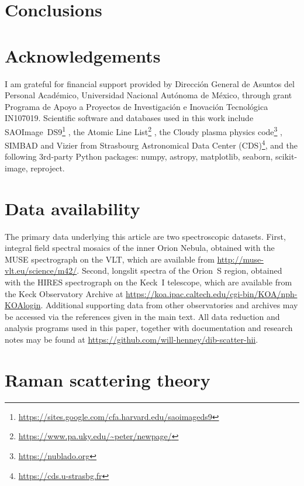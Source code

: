 \documentclass[useAMS, usenatbib, a4paper]{mnras}
\begin{document}
\section{Conclusions}
\label{sec:conclusions}




\section*{Acknowledgements}
I am grateful for financial support provided by
\foreignlanguage{spanish}{
  Dirección General de Asuntos del Personal Académico,
  Universidad Nacional Autónoma de México},
through grant
\foreignlanguage{spanish}{
  Programa de Apoyo a Proyectos de Investigación
  e Inovación Tecnológica}
IN107019.
Scientific software and databases used in this work include
SAOImage~DS9\footnote{\url{https://sites.google.com/cfa.harvard.edu/saoimageds9}} \citep{Joye:2003a},
the Atomic Line List\footnote{\url{https://www.pa.uky.edu/~peter/newpage/}} \citep{Van-Hoof:2018a},
the Cloudy plasma physics code\footnote{\url{https://nublado.org}}
\citep{Ferland:2017a},
SIMBAD and Vizier from Strasbourg Astronomical Data Center (CDS)\footnote{\url{https://cds.u-strasbg.fr}},
and the following 3rd-party Python packages:
numpy, astropy, matplotlib, seaborn, scikit-image, reproject.


\section*{Data availability}
\label{sec:data-availability}

The primary data underlying this article are two spectroscopic datasets.
First, integral field spectral mosaics of the inner Orion Nebula,
obtained with the MUSE spectrograph on the VLT,
which are available from \url{http://muse-vlt.eu/science/m42/}.
Second, longslit spectra of the Orion~S region,
obtained with the HIRES spectrograph on the Keck~I telescope,
which are available from the Keck Observatory Archive at
\url{https://koa.ipac.caltech.edu/cgi-bin/KOA/nph-KOAlogin}.
Additional supporting data from other observatories and archives
may be accessed via the references given in the main text.
All data reduction and analysis programs used in this paper,
together with documentation and research notes may be found at
\url{https://github.com/will-henney/dib-scatter-hii}.



\appendix

\section{Raman scattering theory}
\label{sec:raman-theory}
\end{document}
